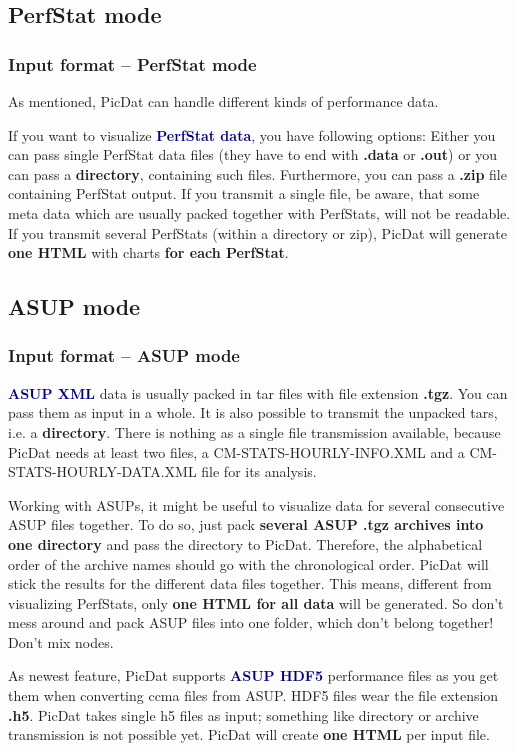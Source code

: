 \documentclass[8pt]{beamer}
\begin{document}
\subsection{PerfStat mode}
\begin{frame}
\frametitle{Input format -- PerfStat mode}
As mentioned, PicDat can handle different kinds of performance data.
\bigskip

If you want to visualize \textcolor{darkblue}{\textbf{PerfStat data}}, you have following options: Either you can pass single PerfStat data files (they have to end with \textbf{.data} or \textbf{.out}) or you can pass a \textbf{directory}, containing such files. Furthermore, you can pass a \textbf{.zip} file containing PerfStat output. If you transmit a single file, be aware, that some meta data which are usually packed together with PerfStats, will not be readable. If you transmit several PerfStats (within a directory or zip), PicDat will generate \textbf{one HTML} with charts \textbf{for each PerfStat}. 
\end{frame}

\subsection{ASUP mode}
\begin{frame}
\frametitle{Input format -- ASUP mode}
\textcolor{darkblue}{\textbf{ASUP XML}} data is usually packed in tar files with file extension \textbf{.tgz}. You can pass them as input in a whole. It is also possible to transmit the unpacked tars, i.e. a \textbf{directory}. There is nothing as a single file transmission available, because PicDat needs at least two files, a CM-STATS-HOURLY-INFO.XML and a CM-STATS-HOURLY-DATA.XML file for its analysis. 

Working with ASUPs, it might be useful to visualize data for several consecutive ASUP files together. To do so, just pack \textbf{several ASUP .tgz archives into one directory} and pass the directory to PicDat. Therefore, the alphabetical order of the archive names should go with the chronological order. PicDat will stick the results for the different data files together. This means, different from visualizing PerfStats, only \textbf{one HTML for all data} will be generated. So don't mess around and pack ASUP files into one folder, which don't belong together! Don't mix nodes.
\bigskip

As newest feature, PicDat supports \textcolor{darkblue}{\textbf{ASUP HDF5}} performance files as you get them when converting ccma files from ASUP. HDF5 files wear the file extension \textbf{.h5}. PicDat takes single h5 files as input; something like directory or archive transmission is not possible yet. PicDat will create \textbf{one HTML} per input file. 
\end{frame}
\end{document}
